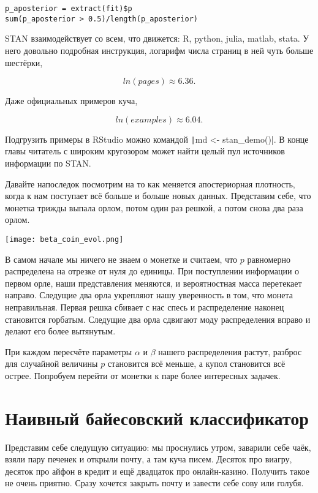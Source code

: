 \begin{verbatim}
p_aposterior = extract(fit)$p
sum(p_aposterior > 0.5)/length(p_aposterior)
\end{verbatim}

STAN взаимодействует со всем, что движется: R, python, julia, matlab, stata. У него довольно подробная инструкция, логарифм числа страниц в ней чуть больше шестёрки, 

\[ln(pages) \approx 6.36.\]

Даже официальных примеров куча, 

\[ln(examples) \approx 6.04.\] 

 Подгрузить примеры в RStudio можно командой \texttt|md <- stan_demo()|.  В конце главы читатель с широким кругозором может найти целый пул  источников информации по STAN. 

Давайте напоследок посмотрим на то как меняется апостериорная плотность, когда к нам поступает всё больше и больше новых данных.  Представим себе, что монетка трижды выпала орлом, потом один раз решкой, а потом снова два раза орлом.  

\begin{center}
\texttt{[image: beta\_coin\_evol.png]}
\end{center}

В самом начале мы ничего не знаем о монетке и считаем, что $p$ равномерно распределена на отрезке от нуля до единицы. При поступлении информации о первом орле, наши представления меняются, и вероятностная масса перетекает направо. Следущие два орла укрепляют нашу уверенность в том, что монета неправильная. Первая решка сбивает с нас спесь и распределение наконец становится горбатым.  Следущие два орла сдвигают моду распределения вправо и делают его более вытянутым. 

При каждом пересчёте параметры $\alpha$ и $\beta$ нашего распределения растут, разброс для случайной величины $p$ становится всё меньше, а купол становится всё острее.  Попробуем перейти от монетки к паре более интересных задачек. 

\section{Наивный байесовский классификатор} 

Представим себе следущую ситуацию: мы проснулись утром, заварили себе чаёк, взяли пару печенек и открыли почту, а там куча писем.  Десяток про виагру, десяток про айфон в кредит и ещё двадцаток про онлайн-казино. Получить такое  не очень приятно. Сразу хочется закрыть почту и завести себе сову или голубя. 

